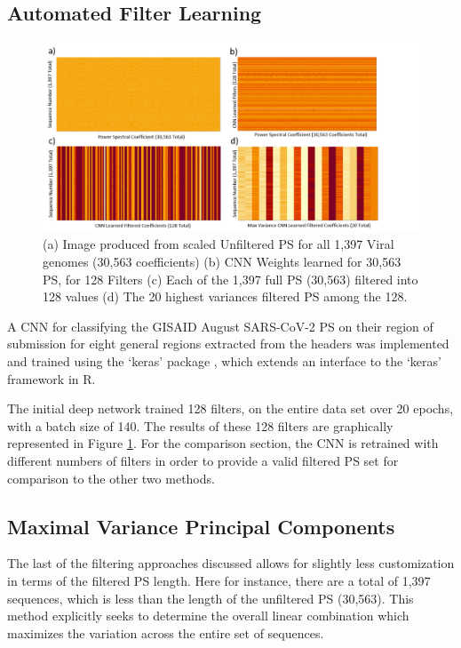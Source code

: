 \documentclass[12pt,conference]{IEEEtran}
\begin{document}
\subsection{Automated Filter Learning}
\begin{figure}[h!]
\centering
\caption{(a) Image produced from scaled Unfiltered PS for all 1,397 Viral genomes (30,563 coefficients) (b) CNN Weights learned for 30,563 PS, for 128 Filters (c) Each of the 1,397 full PS (30,563) filtered into 128 values (d) The 20 highest variances filtered PS among the 128.  \label{fig:CNN128Filts}}
\includegraphics[scale=0.35]{Images/Files/CNNFilters.png}
\end{figure}

A CNN for classifying the GISAID August SARS-CoV-2 PS on their region of submission for eight general regions extracted from the headers was implemented and trained using the `keras' package \cite{kerR21}, 
which extends an interface to the `keras' framework in R.

The initial deep network trained 128 filters, on the entire data set over 20 epochs, with a batch size of 140. 
The results of these 128 filters are graphically represented in Figure \ref{fig:CNN128Filts}.
For the comparison section, the CNN is retrained with different numbers of filters in order to provide a 
valid filtered PS set for comparison to the other two methods. 
\subsection{Maximal Variance Principal Components}

The last of the filtering approaches discussed allows for slightly less customization in terms of the filtered PS 
length. 
Here for instance, there are a total of 1,397 sequences, which is less than the length of the unfiltered PS (30,563). 
This method explicitly seeks to determine the overall linear combination which maximizes the variation across the entire 
set of sequences. 
\end{document}
